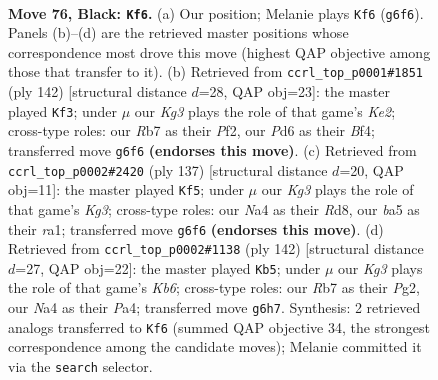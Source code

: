 \documentclass[11pt]{article}
\begin{document}
\clearpage

\begin{figure}[p]\centering
\begin{subfigure}{0.46\textwidth}\centering
\resizebox{\linewidth}{!}{%
\newchessgame
\chessboard[
  setfen={8/1r6/3p2kp/B3p1b1/n3P2p/3K1P1R/8/8 b - - 1 76},
  showmover=false,
  pgfstyle=straightmove, color=movearrow, markmove={g6-f6}
]}
\caption{}
\end{subfigure}\hfill
\begin{subfigure}{0.46\textwidth}\centering
\resizebox{\linewidth}{!}{%
\newchessgame
\chessboard[
  setfen={3b4/5k2/2RP2p1/3r1p1p/5B1P/6P1/4KP2/8 w - - 61 72},
  showmover=false,
  pgfstyle=straightmove, color=movearrow, markmove={e2-f3}
]}
\caption{}
\end{subfigure}
\\[4pt]
\begin{subfigure}{0.46\textwidth}\centering
\resizebox{\linewidth}{!}{%
\newchessgame
\chessboard[
  setfen={3r4/8/6k1/6pp/4p3/2K2bP1/5P1R/R7 b - - 11 69},
  showmover=false,
  pgfstyle=straightmove, color=movearrow, markmove={g6-f5}
]}
\caption{}
\end{subfigure}\hfill
\begin{subfigure}{0.46\textwidth}\centering
\resizebox{\linewidth}{!}{%
\newchessgame
\chessboard[
  setfen={3R4/8/1KB2k2/p4p2/Pb5r/7P/6P1/8 w - - 45 72},
  showmover=false,
  pgfstyle=straightmove, color=movearrow, markmove={b6-b5}
]}
\caption{}
\end{subfigure}
\caption{\textbf{Move 76, Black: \texttt{Kf6}.} (a) Our position; Melanie plays \texttt{Kf6} (\texttt{g6f6}). Panels (b)--(d) are the retrieved master positions whose correspondence most drove this move (highest QAP objective among those that transfer to it). (b) Retrieved from \texttt{ccrl\_top\_p0001\#1851} (ply 142) [structural distance $d$=28, QAP obj=23]: the master played \texttt{Kf3}; under $\mu$ our \emph{Kg3} plays the role of that game's \emph{Ke2}; cross-type roles: our \emph{R}b7 as their \emph{P}f2, our \emph{P}d6 as their \emph{B}f4; transferred move \texttt{g6f6} \textbf{(endorses this move)}. (c) Retrieved from \texttt{ccrl\_top\_p0002\#2420} (ply 137) [structural distance $d$=20, QAP obj=11]: the master played \texttt{Kf5}; under $\mu$ our \emph{Kg3} plays the role of that game's \emph{Kg3}; cross-type roles: our \emph{N}a4 as their \emph{R}d8, our \emph{b}a5 as their \emph{r}a1; transferred move \texttt{g6f6} \textbf{(endorses this move)}. (d) Retrieved from \texttt{ccrl\_top\_p0002\#1138} (ply 142) [structural distance $d$=27, QAP obj=22]: the master played \texttt{Kb5}; under $\mu$ our \emph{Kg3} plays the role of that game's \emph{Kb6}; cross-type roles: our \emph{R}b7 as their \emph{P}g2, our \emph{N}a4 as their \emph{P}a4; transferred move \texttt{g6h7}. Synthesis: 2 retrieved analogs transferred to \texttt{Kf6} (summed QAP objective 34, the strongest correspondence among the candidate moves); Melanie committed it via the \texttt{search} selector.}
\label{fig:thought-m151}
\end{figure}
\end{document}
